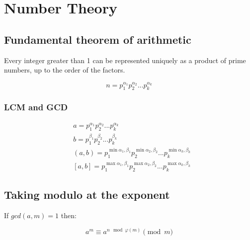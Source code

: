 \section{Number Theory}


























\subsection{Fundamental theorem of arithmetic}

Every integer greater than 1 can be represented uniquely as a product of prime numbers, up to the order of the factors.

\begin{equation}
    n = p_1^{\alpha_1} p_2^{\alpha_2} ... p_k^{\alpha_k}
\end{equation}

\subsubsection{LCM and GCD}

\begin{equation}
\begin{aligned}
    & a = p_1^{\alpha_1} p_2^{\alpha_2} ... p_k^{\alpha_k}  \\
    & b = p_1^{\beta_1} p_2^{\beta_2} ... p_k^{\beta_k} \\
    & (a,b) = p_1^{\min{{\alpha_1, \beta_1}}} p_2^{\min{{\alpha_2, \beta_2}}} ... p_k^{\min{{\alpha_k, \beta_k}}} \\
    & [a,b] = p_1^{\max{{\alpha_1, \beta_1}}} p_2^{\max{{\alpha_2, \beta_2}}} ... p_k^{\max{{\alpha_k, \beta_k}}}
\end{aligned}
\end{equation}


\subsection{Taking modulo at the exponent}

If $gcd(a,m) = 1$ then:

\begin{equation}
    a^{m} \equiv a^{n \mod \varphi(m)} \pmod{m}
\end{equation}

